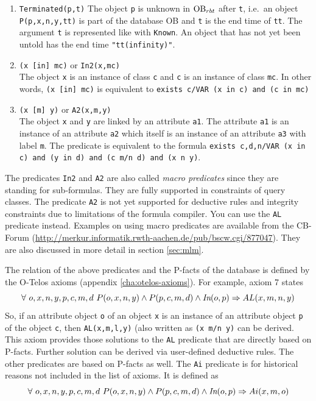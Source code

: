 \begin{enumerate}
\item {\tt Terminated(p,t)}
The object {\tt p} is unknown in $\hbox{\rm OB}_{rbt}$ after {\tt t}, i.e.\ an object {\tt P(p,x,n,y,tt)} is
part of the database OB and {\tt t} is the end time of {\tt tt}. The argument
{\tt t} is represented like with {\tt Known}.
An object that has not yet been untold has the end time \verb+"tt(infinity)"+.
\item {\tt (x [in] mc)} or {\tt In2(x,mc)}\\
The object {\tt x} is an instance of class {\tt c} and {\tt c} is an instance of class {\tt mc}.
In other words, {\tt (x [in] mc)} is equivalent to 
{\tt exists c/VAR (x in c) and (c in mc)}
\item {\tt (x [m] y)} or {\tt A2(x,m,y)}\\
The object {\tt x} and {\tt y} are linked by an attribute {\tt a1}. 
The attribute {\tt a1} is an instance of an attribute {\tt a2}
which itself is an instance of an attribute {\tt a3} with label {\tt m}.
The predicate is equivalent to the formula
{\tt exists c,d,n/VAR (x in c) and (y in d) and (c m/n d) and (x n y)}.
\end{enumerate}

The predicates {\tt In2} and {\tt A2} are also called {\em macro predicates} since they are standing
for sub-formulas. They are fully supported in constraints of query classes.
The predicate {\tt A2} is not yet supported for deductive rules and integrity constraints
due to limitations of the formula compiler. You can use the {\tt AL} predicate instead.
Examples on using macro predicates are available from the CB-Forum
(\url{http://merkur.informatik.rwth-aachen.de/pub/bscw.cgi/877047}). They are
also discussed in more detail in section \ref{sec:mlm}.


The relation of the above predicates and the P-facts of the database is defined by the O-Telos
axioms (appendix \ref{cha:otelos-axioms}). For example, axiom 7 states
$$
\forall ~o,x,n,y,p,c,m,d ~P(o,x,n,y) \land P(p,c,m,d) \land \hbox{\it In}(o,p)
        \Rightarrow AL(x,m,n,y)
$$
So, if an attribute object {\tt o} of an object {\tt x} is an instance
of an attribute object {\tt p} of the object {\tt c}, then {\tt AL(x,m,l,y)} (also
written as {\tt (x m/n y)} can be derived. This axiom provides those solutions to
the {\tt AL} predicate that are directly based on P-facts. Further solution can be derived
via user-defined deductive rules. The other predicates are based on P-facts as well.
The {\tt Ai} predicate is for historical reasons not included in the list of axioms.
It is defined as
$$
\forall ~o,x,n,y,p,c,m,d ~P(o,x,n,y) \land P(p,c,m,d) \land \hbox{\it In}(o,p)
        \Rightarrow Ai(x,m,o)
$$

